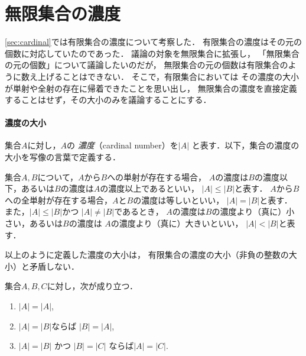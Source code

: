    
   
   
%
 \section{無限集合の濃度}
 \label{sec:aleph}
  \ref{sec:cardinal}では有限集合の濃度について考察した．
  有限集合の濃度はその元の個数に対応していたのであった．
  議論の対象を無限集合に拡張し，
  「無限集合の元の個数」について議論したいのだが，
  無限集合の元の個数は有限集合のように数え上げることはできない．
  そこで，有限集合においては
  その濃度の大小が単射や全射の存在に帰着できたことを思い出し，
  無限集合の濃度を直接定義することはせず，その大小のみを議論することにする．
  \paragraph{濃度の大小}
   集合$A$に対し，$A$の
   \emph{濃度}（cardinal number）を$\lvert A \rvert$
   と表す．以下，集合の濃度の大小を写像の言葉で定義する．

   集合$A, B$について，$A$から$B$への単射が存在する場合，
   $A$の濃度は$B$の濃度以下，あるいは$B$の濃度は$A$の濃度以上であるといい，
   $\lvert A \rvert \leq \lvert B \rvert$と表す．
   $A$から$B$への全単射が存在する場合，$A$と$B$の濃度は等しいといい，
   $\lvert A \rvert = \lvert B \rvert$と表す．
   また，$\lvert A \rvert \leq \lvert B \rvert$かつ
   $\lvert A \rvert \neq \lvert B \rvert$であるとき，
   $A$の濃度は$B$の濃度より（真に）小さい，あるいは$B$の濃度は
   $A$の濃度より（真に）大きいといい，
   $\lvert A \rvert < \lvert B \rvert$と表す．

   以上のように定義した濃度の大小は，
   有限集合の濃度の大小（非負の整数の大小）と矛盾しない．

   
   \begin{thm} \label{thm:carddouti}
     集合$A,B,C$に対し，次が成り立つ．
     \begin{enumerate}
       \item $\lvert A \rvert = \lvert A \rvert $,
       \item $\lvert A \rvert = \lvert B \rvert $ならば
         $\lvert B \rvert = \lvert A \rvert $,
       \item $\lvert A \rvert = \lvert B \rvert$ 
             かつ $\lvert B \rvert = \lvert C \rvert $
             ならば$\lvert A \rvert = \lvert C \rvert$.
     \end{enumerate}
   \end{thm}

